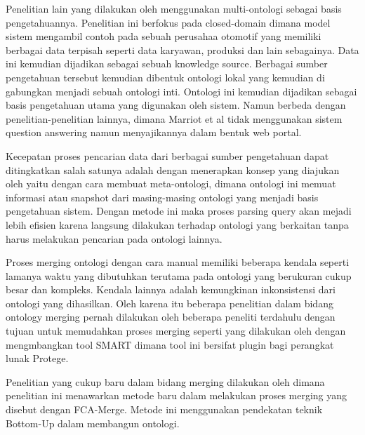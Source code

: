 Penelitian lain yang dilakukan oleh \citet*{marriot} menggunakan multi-ontologi sebagai basis pengetahuannya. Penelitian ini berfokus pada closed-domain dimana model sistem mengambil contoh pada sebuah perusahaa otomotif yang memiliki berbagai data terpisah seperti data karyawan, produksi dan lain sebagainya. Data ini kemudian dijadikan sebagai sebuah knowledge source. Berbagai sumber pengetahuan tersebut kemudian dibentuk ontologi lokal yang kemudian di gabungkan menjadi sebuah ontologi inti. Ontologi ini kemudian dijadikan sebagai basis pengetahuan utama yang digunakan oleh sistem. Namun berbeda dengan penelitian-penelitian lainnya, dimana Marriot et al tidak menggunakan sistem question answering namun menyajikannya dalam bentuk web portal.

Kecepatan proses pencarian data dari berbagai sumber pengetahuan dapat ditingkatkan salah satunya adalah dengan menerapkan konsep yang diajukan oleh \citet*{vargas_motta} yaitu dengan cara membuat meta-ontologi, dimana ontologi ini memuat informasi atau snapshot dari masing-masing ontologi yang menjadi basis pengetahuan sistem. Dengan metode ini maka proses parsing query akan mejadi lebih efisien karena langsung dilakukan terhadap ontologi yang berkaitan tanpa harus melakukan pencarian pada ontologi lainnya.

Proses merging ontologi dengan cara manual memiliki beberapa kendala seperti lamanya waktu yang dibutuhkan terutama pada ontologi yang berukuran cukup besar dan kompleks. Kendala lainnya adalah kemungkinan inkonsistensi dari ontologi yang dihasilkan. Oleh karena itu beberapa penelitian dalam bidang ontology merging pernah dilakukan oleh beberapa peneliti terdahulu dengan tujuan untuk memudahkan proses merging seperti yang dilakukan oleh \citet*{noy_mussen} dengan mengmbangkan tool SMART dimana tool ini bersifat plugin bagi perangkat lunak Protege. 

Penelitian yang cukup baru dalam bidang merging dilakukan oleh \citet*{stumme_maedche} dimana penelitian ini menawarkan metode baru dalam melakukan proses merging yang disebut dengan FCA-Merge. Metode ini menggunakan pendekatan teknik Bottom-Up dalam membangun ontologi.

